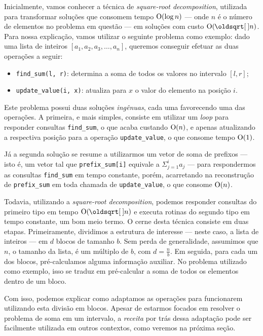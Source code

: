 Inicialmente, vamos conhecer a técnica de \emph{square-root decomposition}, utilizada para transformar soluções que consomem tempo $\mathrm{O}(\log n)$ --- onde $n$ é o número de elementos no problema em questão --- em soluções com custo $\Oh(\sqrt{n})$. Para nossa explicação, vamos utilizar o seguinte problema como exemplo: dado uma lista de inteiros $ [ a_1, a_2, a_3, \dots, a_n ] $, queremos conseguir efetuar as duas operações a seguir:

\begin{itemize}
    \item \texttt{find\_sum(l, r)}: determina a soma de todos os valores no intervalo $[l,r]$;
    \item \texttt{update\_value(i, x)}: atualiza para $x$ o valor do elemento na posição $i$.
\end{itemize}

Este problema possui duas soluções \emph{ingênuas}, cada uma favorecendo uma das operações. A primeira, e mais simples, consiste em utilizar um \emph{loop} para responder consultas \texttt{find\_sum}, o que acaba custando $\mathrm{O}(n)$, e apenas atualizando a respectiva posição para a operação \texttt{update\_value}, o que consome tempo $\mathrm{O}(1)$.

Já a segunda solução se resume a utilizarmos um vetor de soma de prefixos --- isto é, um vetor tal que \texttt{prefix\_sum[i]} equivale a $\Sigma_{j=1}^{i} a_j$ --- para respondermos as consultas \texttt{find\_sum} em tempo constante, porém, acarretando na reconstrução de \texttt{prefix\_sum} em toda chamada de \texttt{update\_value}, o que consome $\mathrm{O}(n)$.

Todavia, utilizando a \emph{square-root decomposition}, podemos responder consultas do primeiro tipo em tempo $\Oh(\sqrt{n})$ e executa rotinas do segundo tipo em tempo constante, um bom meio termo. O cerne desta técnica consiste em duas etapas. Primeiramente, dividimos a estrutura de interesse --- neste caso, a lista de inteiros --- em $d$ blocos de tamanho $b$. Sem perda de generalidade, assumimos que $n$, o tamanho da lista, é um múltiplo de $b$, com $d = \frac{n}{b}$. Em seguida, para cada um dos blocos, pré-calculamos alguma informação auxiliar. No problema utilizado como exemplo, isso se traduz em pré-calcular a soma de todos os elementos dentro de um bloco.

Com isso, podemos explicar como adaptamos as operações para funcionarem utilizando esta divisão em blocos. Apesar de estarmos focados em resolver o problema de soma em um intervalo, a \emph{receita} por trás dessa adaptação pode ser facilmente utilizada em outros contextos, como veremos na próxima seção.

